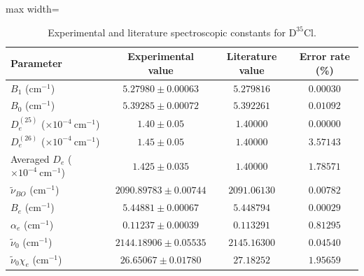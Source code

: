 \documentclass[12pt]{article}
\begin{document}
\begin{table}[htbp]
\centering
\small
\caption{Experimental and literature spectroscopic constants for \(\mathrm{D}^{35}\mathrm{Cl}\).}
\label{tab:dcl_constants}
\begin{adjustbox}{max width=\linewidth}
\begin{tabular}{lccc}
\toprule
Parameter & Experimental value & Literature value & Error rate (\%) \\
\midrule
\(B_1\) (\(\mathrm{cm}^{-1}\)) & \(5.27980 \pm 0.00063\) & \(5.279816\) & \(0.00030\) \\
\(B_0\) (\(\mathrm{cm}^{-1}\)) & \(5.39285 \pm 0.00072\) & \(5.392261\) & \(0.01092\) \\
\(D_e^{(25)}\) (\(\times 10^{-4}\ \mathrm{cm}^{-1}\)) & \(1.40 \pm 0.05\) & \(1.40000\) & \(0.00000\) \\
\(D_e^{(26)}\) (\(\times 10^{-4}\ \mathrm{cm}^{-1}\)) & \(1.45 \pm 0.05\) & \(1.40000\) & \(3.57143\) \\
Averaged \(D_e\) (\(\times 10^{-4}\ \mathrm{cm}^{-1}\))& \(1.425 \pm 0.035\) & \(1.40000\) & \(1.78571\) \\
\(\tilde{\nu}_{BO}\) (\(\mathrm{cm}^{-1}\)) & \(2090.89783 \pm 0.00744\) & \(2091.06130\) & \(0.00782\) \\
\(B_e\) (\(\mathrm{cm}^{-1}\)) & \(5.44881 \pm 0.00067\) & \(5.448794\) & \(0.00029\) \\
\(\alpha_e\) (\(\mathrm{cm}^{-1}\)) & \(0.11237 \pm 0.00039\) & \(0.113291\) & \(0.81295\) \\
\(\tilde{\nu}_{0}\) (\(\mathrm{cm}^{-1}\)) & \(2144.18906 \pm 0.05535\) & \(2145.16300\) & \(0.04540\) \\
\(\tilde{\nu}_{0}\chi_e\) (\(\mathrm{cm}^{-1}\)) & \(26.65067 \pm 0.01780\) & \(27.18252\) & \(1.95659\) \\
\bottomrule
\end{tabular}
\end{adjustbox}
\end{table}
\end{document}
